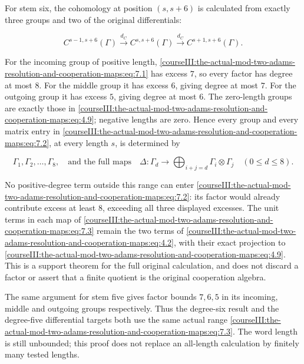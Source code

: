 For stem six, the cohomology at position \((s,s+6)\) is calculated from exactly three groups and two of the original differentials:

\begin{equation}
C^{s-1,s+6}(\Gamma)\xrightarrow{d_C}
 C^{s,s+6}(\Gamma)\xrightarrow{d_C}
 C^{s+1,s+6}(\Gamma).
 \label{courseIII:the-actual-mod-two-adams-resolution-and-cooperation-maps:eq:7.2}
\end{equation}

For the incoming group of positive length, \eqref{courseIII:the-actual-mod-two-adams-resolution-and-cooperation-maps:eq:7.1} has excess \(7\), so every factor has degree at most \(8\). For the middle group it has excess \(6\), giving degree at most \(7\). For the outgoing group it has excess \(5\), giving degree at most \(6\). The zero-length groups are exactly those in \eqref{courseIII:the-actual-mod-two-adams-resolution-and-cooperation-maps:eq:4.9}; negative lengths are zero. Hence every group and every matrix entry in \eqref{courseIII:the-actual-mod-two-adams-resolution-and-cooperation-maps:eq:7.2}, at every length \(s\), is determined by

\begin{equation}
\Gamma_1,\Gamma_2,\ldots,\Gamma_8,
 \quad\text{and the full maps}\quad
 \Delta:\Gamma_d\longrightarrow
       \bigoplus_{i+j=d}\Gamma_i\otimes\Gamma_j
       \quad(0\leq d\leq8).
 \label{courseIII:the-actual-mod-two-adams-resolution-and-cooperation-maps:eq:7.3}
\end{equation}

No positive-degree term outside this range can enter \eqref{courseIII:the-actual-mod-two-adams-resolution-and-cooperation-maps:eq:7.2}: its factor would already contribute excess at least \(8\), exceeding all three displayed excesses. The unit terms in each map of \eqref{courseIII:the-actual-mod-two-adams-resolution-and-cooperation-maps:eq:7.3} remain the two terms of \eqref{courseIII:the-actual-mod-two-adams-resolution-and-cooperation-maps:eq:4.2}, with their exact projection to \eqref{courseIII:the-actual-mod-two-adams-resolution-and-cooperation-maps:eq:4.9}. This is a support theorem for the full original calculation, and does not discard a factor or assert that a finite quotient is the original cooperation algebra.

The same argument for stem five gives factor bounds \(7,6,5\) in its incoming, middle and outgoing groups respectively. Thus the degree-six result and the degree-five differential targets both use the same actual range \eqref{courseIII:the-actual-mod-two-adams-resolution-and-cooperation-maps:eq:7.3}. The word length is still unbounded; this proof does not replace an all-length calculation by finitely many tested lengths.

